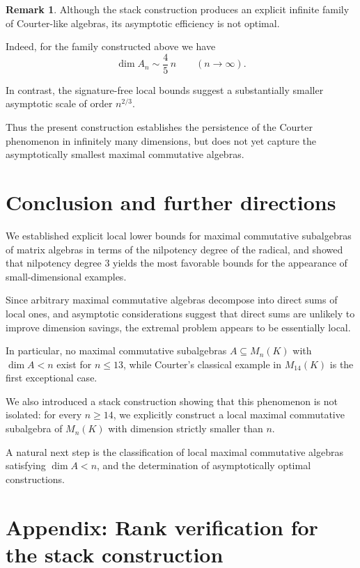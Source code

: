 \documentclass[11pt]{article}
\theoremstyle{remark}
\theoremstyle{plain}
\theoremstyle{definition}
\theoremstyle{myremark}
\newtheorem{remark}{Remark}
\begin{document}
\begin{remark}
	Although the stack construction produces an explicit infinite family of
	Courter-like algebras, its asymptotic efficiency is not optimal.
	
	Indeed, for the family constructed above we have
	\[
	\dim A_n \sim \frac45\,n
	\qquad (n\to\infty).
	\]
	
	In contrast, the signature-free local bounds suggest a substantially
	smaller asymptotic scale of order $	n^{2/3}.$
	
	Thus the present construction establishes the persistence of the Courter
	phenomenon in infinitely many dimensions, but does not yet capture the
	asymptotically smallest maximal commutative algebras.
\end{remark}

\section*{Conclusion and further directions}

We established explicit local lower bounds for maximal commutative
subalgebras of matrix algebras in terms of the nilpotency degree of the
radical, and showed that nilpotency degree \(3\) yields the most
favorable bounds for the appearance of small-dimensional examples.

Since arbitrary maximal commutative algebras decompose into direct sums
of local ones, and asymptotic considerations suggest that direct sums are
unlikely to improve dimension savings, the extremal problem appears to be
essentially local.

In particular, no maximal commutative subalgebras
\(A\subseteq M_n(K)\) with \(\dim A<n\) exist for \(n\le13\), while
Courter's classical example in \(M_{14}(K)\) is the first exceptional
case.

We also introduced a stack construction showing that this phenomenon is
not isolated: for every \(n\ge14\), we explicitly construct a local
maximal commutative subalgebra of \(M_n(K)\) with dimension strictly
smaller than \(n\).

A natural next step is the classification of local maximal commutative
algebras satisfying \(\dim A<n\), and the determination of asymptotically
optimal constructions.



\section*{Appendix: Rank verification for the stack construction}
\end{document}
